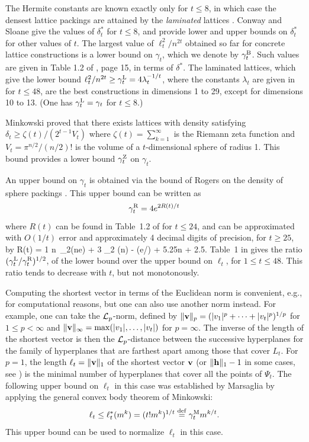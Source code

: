 The Hermite constants are known exactly only for $t\le 8$, in which 
case the densest lattice packings are
attained by the {\em laminated\/} lattices \cite{mCON99a}.
Conway and Sloane \cite[Table 1.2]{mCON99a} give the 
values of $\delta_t^*$ for $t\le 8$, and provide lower and upper
bounds on $\delta_t^*$ for other values of $t$.
The largest value of $\ell_t^2/n^{2t}$ obtained so far for concrete lattice 
constructions is a lower bound on $\gamma_t$, which we denote by
$\gamma_t^{{\rm B}}$.  Such values are given in Table 1.2 of \cite{mCON99a}, 
page 15, in terms of $\delta^*$.
The laminated lattices, which give the lower bound 
$\ell_t^2/n^{2t} \ge \gamma_t^{{\rm L}} = 4 \lambda_t^{-1/t}$,
where the constants $\lambda_t$ are given in 
\cite[Table 6.1, page 158]{mCON99a} for $t\le 48$,
are the best constructions in dimensions 1 to 29, except for 
dimensions 10 to 13.
(One has $\gamma_t^{{\rm L}} = \gamma_t$ for $t\le 8$.)

Minkowski proved that there exists lattices with density satisfying
$\delta_t \ge \zeta(t) / (2^{t-1} V_t)$ where $\zeta(t) = \sum_{k=1}^\infty$
is the Riemann zeta function and $V_t = \pi^{n/2} / (n/2)!$ 
is the volume of a $t$-dimensional sphere of radius 1.
This bound provides a lower bound $\gamma_t^{\rm Z}$ on $\gamma_t$.

An upper bound on $\gamma_t$ is obtained via the bound of Rogers on the 
density of sphere packings \cite{mCON99a}.
This upper bound can be written as
$$
 \gamma_t^{{\rm R}} = 4 e^{2R(t)/t}
$$
where $R(t)$ can be found in Table~1.2 of \cite{mCON99a} for $t\le 24$,
and can be approximated with $O(1/t)$ error and approximately 4 decimal
digits of precision, for $t\ge 25$, by
\eq
 R(t) =   {1} n \,\log_2\left({n\pi e}\right)
        + {3} \log_2 (n)
        - \lg (e/\sqrt{\pi})  + {5.25\over n + 2.5}.
\endeq
Table~1 in \cite{rLEC99c} gives the ratio 
$(\gamma_t^{{\rm L}} / \gamma_t^{{\rm R}})^{1/2}$,
of the lower bound over the upper bound on $\ell_t$, for $1\le t\le 48$.
This ratio tends to decrease with $t$, but not monotonously.

Computing the shortest vector in terms of the Euclidean norm is convenient,
e.g., for computational reasons, but one can also use another norm instead.
For example, one can take the ${\cal L}_p$-norm, defined by
$\Vert{\bf v}\Vert_p = (|v_1|^p + \cdots + |v_t|^p)^{1/p}$ for $1\le p < \infty$
and $\Vert{\bf v}\Vert_\infty = \max(|v_1|, \dots, |v_t|)$ for $p = \infty$.
The inverse of the length of the shortest vector is then the ${\cal L}_p$-distance
between the successive hyperplanes for the family of hyperplanes that are 
farthest apart among those that cover $L_t$.
For $p=1$, the length $\ell_t = \Vert{\bf v}\Vert_1$ of the shortest vector ${\bf v}$
(or $\Vert{\bf h}\Vert_1 - 1$ in some cases, see \cite{rKNU97a})
is the minimal number of hyperplanes that cover all the points of $\Psi_t$.
The following upper bound on $\ell_t$ in this case was established by 
Marsaglia \cite{rMAR68a} by 
applying the general convex body theorem of Minkowski:
$$ 
  \ell_t \le \ell_t^*(m^k) = (t! m^k)^{1/t} \eqdef \gamma_t^{\rm M} m^{k/t}.
$$
This upper bound can be used to normalize $\ell_t$ in this case.

